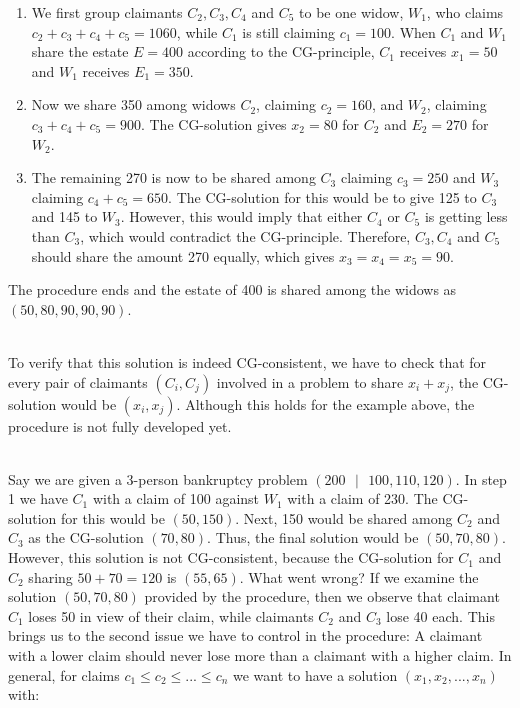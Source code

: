 \documentclass[12pt]{article}
\begin{document}
\begin{enumerate}
    \item We first group claimants $C_2, C_3, C_4$ and $C_5$ to be one widow, $W_1$, who claims $c_2 + c_3 + c_4 + c_5 = 1060$, while $C_1$ is still claiming $c_1 = 100$.
    When $C_1$ and $W_1$ share the estate $E = 400$ according to the CG-principle, $C_1$ receives $x_1 = 50$ and $W_1$ receives $E_1 = 350$. 
    \item Now we share 350 among widows $C_2$, claiming $c_2 = 160$, and $W_2$, claiming $c_3 + c_4 + c_5 = 900$.
    The CG-solution gives $x_2 = 80$ for $C_2$ and $E_2 = 270$ for $W_2$.
    \item The remaining 270 is now to be shared among $C_3$ claiming $c_3 = 250$ and $W_3$ claiming $c_4 + c_5 = 650$.
    The CG-solution for this would be to give 125 to $C_3$ and 145 to $W_3$.
    However, this would imply that either $C_4$ or $C_5$ is getting less than $C_3$, which would contradict the CG-principle.
    Therefore, $C_3, C_4$ and $C_5$ should share the amount 270 equally, which gives $x_3 = x_4 = x_5 = 90$.
\end{enumerate}

\noindent
The procedure ends and the estate of 400 is shared among the widows as $(50, 80, 90, 90, 90)$.

\noindent
\\
To verify that this solution is indeed CG-consistent, we have to check that for every pair of claimants $(C_i, C_j)$ involved in a problem to share $x_i + x_j$, the CG-solution would be $(x_i, x_j)$.
Although this holds for the example above, the procedure is not fully developed yet.

\noindent
\\
Say we are given a 3-person bankruptcy problem $(200 \text{ } | \text{ } 100, 110, 120)$.
In step 1 we have $C_1$ with a claim of 100 against $W_1$ with a claim of 230.
The CG-solution for this would be $(50, 150)$.
Next, 150 would be shared among $C_2$ and $C_3$ as the CG-solution $(70, 80)$.
Thus, the final solution would be $(50, 70, 80)$.
However, this solution is not CG-consistent, because the CG-solution for $C_1$ and $C_2$ sharing $50 + 70 = 120$ is $(55, 65)$.
What went wrong?
If we examine the solution $(50, 70, 80)$ provided by the procedure, then we observe that claimant $C_1$ loses 50 in view of their claim, while claimants $C_2$ and $C_3$ lose 40 each.
This brings us to the second issue we have to control in the procedure:
A claimant with a lower claim should never lose more than a claimant with a higher claim.
In general, for claims $c_1 \leq c_2 \leq ... \leq c_n$ we want to have a solution $(x_1, x_2, ... , x_n)$ with:
\end{document}
